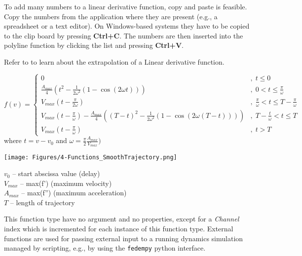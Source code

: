 To add many numbers to a linear derivative function, copy and paste is feasible.
Copy the numbers from the application where they are present
(e.g., a spreadsheet or a text editor). On Windows-based systems they have to be
copied to the clip board by pressing \textbf{Ctrl+C}.
The numbers are then inserted into the polyline function by clicking the list
and pressing \textbf{Ctrl+V}.

Refer to 
to learn about the extrapolation of a Linear derivative function.

\clearpage
{}

{\small $$
  f(v)=\left\{\begin{array}{ll}
    0 &,\; t \leq 0 \\[1mm]
    \frac{A_{max}}{4}\left(
      t^2-\frac{1}{2\omega^2}(1-\cos(2\omega t))\right)
      &,\; 0 < t \leq \frac{\pi}{\omega} \\[1mm]
    V_{max}\left(t-\frac{\pi}{2\omega}\right)
      &,\; \frac{\pi}{\omega} < t \leq T-\frac{\pi}{\omega} \\[1mm]
    V_{max}\left(t-\frac{\pi}{\omega}\right) -
      \frac{A_{max}}{4}\left((T-t)^2-\frac{1}{2\omega^2}(1-\cos(2\omega(T-t)))\right)
      \!\!\!\!&,\; T-\frac{t}{\omega} < t \leq T \\[1mm]
    V_{max}\left(t-\frac{\pi}{\omega}\right)
      &,\; t > T
    \end{array}\right.
$$}
where $t=v-v_0$ and $\omega=\frac{\pi}{2}\frac{A_{max}}{V_{max}})$

\noindent
\begin{minipage}{0.45\textwidth}
  \texttt{[image: Figures/4-Functions\_SmoothTrajectory.png]}
\end{minipage}%
\begin{minipage}{0.55\textwidth}
  $v_0$ -- start abscissa value (delay) \\
  $V_{max}$ -- max(f') (maximum velocity) \\
  $A_{max}$ -- max(f'') (maximum acceleration) \\
  $T$ -- length of trajectory
\end{minipage}


This function type have no argument and no properties, except for a
{\sl Channel} index which is incremented for each instance of this
function type. External functions are used for passing external input to
a running dynamics simulation managed by scripting, e.g., by using the
{\tt fedempy} python interface.

